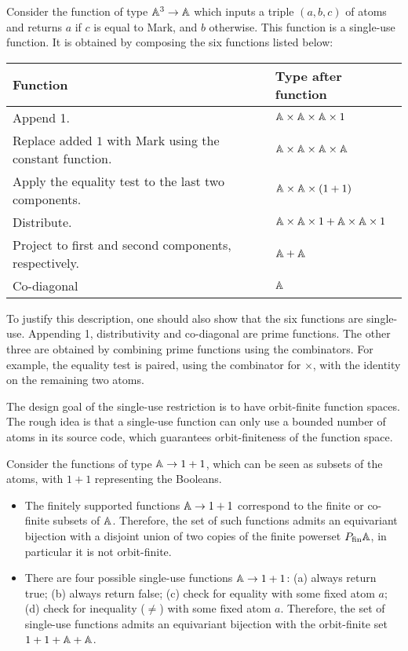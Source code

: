 \documentclass[a4paper,UKenglish,cleveref, autoref, numberwithinsect, thm-restate]{lipics-v2021}
\begin{document}
\begin{example}\label{ex:six-compositions}
    Consider the function of type $\mathbb A^3 \to \mathbb A$ which inputs a triple $(a,b,c)$ of atoms and returns $a$ if $c$ is equal to Mark, and $b$ otherwise. This function is a single-use function. It is obtained by composing the six functions listed below:
\begin{center}
    \begin{tabular}{ll}
        Function & Type after function \\
        \hline
        Append 1. & $ \mathbb A \times \mathbb A \times \mathbb A \times 1$ \\
        Replace added $1$ with Mark using the constant function. & $\mathbb A \times \mathbb A \times \mathbb A \times \mathbb A$ \\
        Apply the equality test to the last two components. & $ \mathbb A \times \mathbb A \times (1+1)$ \\
        Distribute. & $ \mathbb A \times \mathbb A \times 1 +   \mathbb A \times \mathbb A \times 1$ \\
        Project to first and second components, respectively. & $\mathbb A + \mathbb A$ \\
        Co-diagonal & $\mathbb A$ 
    \end{tabular}
\end{center}
To justify this description, one should also show that the six functions are single-use. Appending 1, distributivity and co-diagonal are prime functions. The other three are obtained by combining prime functions using the combinators. For example, the equality test is paired, using the combinator for $\times$, with the identity on the remaining two atoms. \exampleend
\end{example}

The design goal of the single-use restriction is to have orbit-finite function spaces. The rough idea is that a single-use function can only use a bounded number of atoms in its source code, which guarantees orbit-finiteness of the function space. 

\begin{example}\label{ex:first-single-use-function-space}
    Consider the functions of type $\mathbb A \to 1 + 1$, which can be seen as subsets of the atoms, with $1+1$ representing the Booleans.
    \begin{itemize}
        \item The finitely supported functions $\mathbb A \to 1 + 1$ correspond to the finite or co-finite subsets of $\mathbb A$. Therefore, the set of such functions admits an equivariant bijection with a disjoint union of two copies of the finite powerset $\powerset_{\text{fin}} \atoms$, in particular it is not orbit-finite.
        \item There are four possible single-use functions $\mathbb A\to1+1$: (a) always return true; (b) always return false; (c) check for equality with some fixed atom $a$; (d) check for inequality ($\neq$) with some fixed atom $a$.  Therefore,  the set of single-use functions  admits an equivariant bijection with the orbit-finite set $1 + 1 + \mathbb A + \mathbb A$. \exampleend
    \end{itemize}
\end{example}
\end{document}
